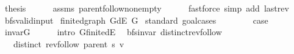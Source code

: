 \begin{isabellebody}
\ {\isacharquery}{\kern0pt}thesis\isanewline
\ \ \ \ \isamarkupfalse%
\ assms\ parent{\isachardot}{\kern0pt}follow{\isacharunderscore}{\kern0pt}non{\isacharunderscore}{\kern0pt}empty\isanewline
\ \ \ \ \isamarkupfalse%
\ {\isacharparenleft}{\kern0pt}fastforce\ simp\ add{\isacharcolon}{\kern0pt}\ last{\isacharunderscore}{\kern0pt}rev{\isacharparenright}{\kern0pt}\isanewline
{}\isamarkupfalse%
%
\endisatagproof
{\isafoldproof}%
%
\isadelimproof
%
\endisadelimproof
%
\isadelimdocument
%
\endisadelimdocument
%
\isatagdocument
%
\isamarkuptrue%
%
\endisatagdocument
{\isafolddocument}%
%
\isadelimdocument
%
\endisadelimdocument
{}\isamarkupfalse%
\ bfs{\isacharunderscore}{\kern0pt}valid{\isacharunderscore}{\kern0pt}input\isanewline
{}\isanewline
{}\isamarkupfalse%
\ finite{\isacharunderscore}{\kern0pt}dgraph\ {\isachardoublequoteopen}G{\isachardot}{\kern0pt}dE\ G{\isachardoublequoteclose}\isanewline
%
\isadelimproof
%
\endisadelimproof
%
\isatagproof
{}\isamarkupfalse%
\ {\isacharparenleft}{\kern0pt}standard{\isacharcomma}{\kern0pt}\ goal{\isacharunderscore}{\kern0pt}cases{\isacharparenright}{\kern0pt}\isanewline
\ \ \isamarkupfalse%
\ {}\isanewline
\ \ \isamarkupfalse%
\ {\isacharquery}{\kern0pt}case\isanewline
\ \ \ \ \isamarkupfalse%
\ invar{\isacharunderscore}{\kern0pt}G\isanewline
\ \ \ \ \isamarkupfalse%
\ {\isacharparenleft}{\kern0pt}intro\ G{\isachardot}{\kern0pt}finite{\isacharunderscore}{\kern0pt}dE{\isacharparenright}{\kern0pt}\isanewline
{}\isamarkupfalse%
%
\endisatagproof
{\isafoldproof}%
%
\isadelimproof
\isanewline
%
\endisadelimproof
{}\isamarkupfalse%
%
\isadelimdocument
%
\endisadelimdocument
%
\isatagdocument
%
\isamarkuptrue%
%
\endisatagdocument
{\isafolddocument}%
%
\isadelimdocument
%
\endisadelimdocument
{}\isamarkupfalse%
\ {\isacharparenleft}{\kern0pt}\ bfs{\isacharunderscore}{\kern0pt}invar{\isacharparenright}{\kern0pt}\ distinct{\isacharunderscore}{\kern0pt}rev{\isacharunderscore}{\kern0pt}follow{\isacharcolon}{\kern0pt}\isanewline
\ \ \ {\isachardoublequoteopen}distinct\ {\isacharparenleft}{\kern0pt}rev{\isacharunderscore}{\kern0pt}follow\ {\isacharparenleft}{\kern0pt}parent\ s{\isacharparenright}{\kern0pt}\ v{\isacharparenright}{\kern0pt}{\isachardoublequoteclose}\isanewline

\end{isabellebody}
